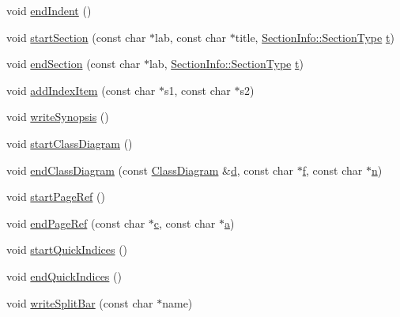 \begin{DoxyCompactItemize}
\item 
void \hyperlink{class_output_list_a07c0ce4a1d6d962c658f6611e4eeab83}{end\+Indent} ()
\item 
void \hyperlink{class_output_list_a9a1d1f6dbf37a65e8ebe099e8c3dd5cf}{start\+Section} (const char $\ast$lab, const char $\ast$title, \hyperlink{struct_section_info_a32308f52dd59422b14fb75a92c90ebf1}{Section\+Info\+::\+Section\+Type} \hyperlink{058__bracket__recursion_8tcl_a69e959f6901827e4d8271aeaa5fba0fc}{t})
\item 
void \hyperlink{class_output_list_ae50a2aac014352256bd3772f4e98237e}{end\+Section} (const char $\ast$lab, \hyperlink{struct_section_info_a32308f52dd59422b14fb75a92c90ebf1}{Section\+Info\+::\+Section\+Type} \hyperlink{058__bracket__recursion_8tcl_a69e959f6901827e4d8271aeaa5fba0fc}{t})
\item 
void \hyperlink{class_output_list_a4d682e57f5f0365a943aeb116ccbfc45}{add\+Index\+Item} (const char $\ast$s1, const char $\ast$s2)
\item 
void \hyperlink{class_output_list_a7d9096a6b81f3183e6f3dc01e4e093f5}{write\+Synopsis} ()
\item 
void \hyperlink{class_output_list_a10f734424e06f796ca4c962e0017d8b6}{start\+Class\+Diagram} ()
\item 
void \hyperlink{class_output_list_ad860823413ef3d95be741afa1e469cb9}{end\+Class\+Diagram} (const \hyperlink{class_class_diagram}{Class\+Diagram} \&\hyperlink{060__command__switch_8tcl_af43f4b1f0064a33b2d662af9f06d3a00}{d}, const char $\ast$\hyperlink{060__command__switch_8tcl_af6830d2c644b45088ea8f1f74a46b778}{f}, const char $\ast$\hyperlink{060__command__switch_8tcl_acdde3cd86eb2421ce8dbb2e85227d368}{n})
\item 
void \hyperlink{class_output_list_a6f14fd99b68f6df4f9510dbc627f5a43}{start\+Page\+Ref} ()
\item 
void \hyperlink{class_output_list_ab6eef37e9e241eeb7a53709f338be0a7}{end\+Page\+Ref} (const char $\ast$\hyperlink{060__command__switch_8tcl_ab14f56bc3bd7680490ece4ad7815465f}{c}, const char $\ast$\hyperlink{060__command__switch_8tcl_ab08ae027fc5777bc4f0629f1b60b35db}{a})
\item 
void \hyperlink{class_output_list_a74849c1452e8884292ed85bf7c22f2bc}{start\+Quick\+Indices} ()
\item 
void \hyperlink{class_output_list_ab1da800b31634af3c518bfa8c0b8323b}{end\+Quick\+Indices} ()
\item 
void \hyperlink{class_output_list_a8633e58cc787bddad99efb8fabea3172}{write\+Split\+Bar} (const char $\ast$name)

\end{DoxyCompactItemize}
